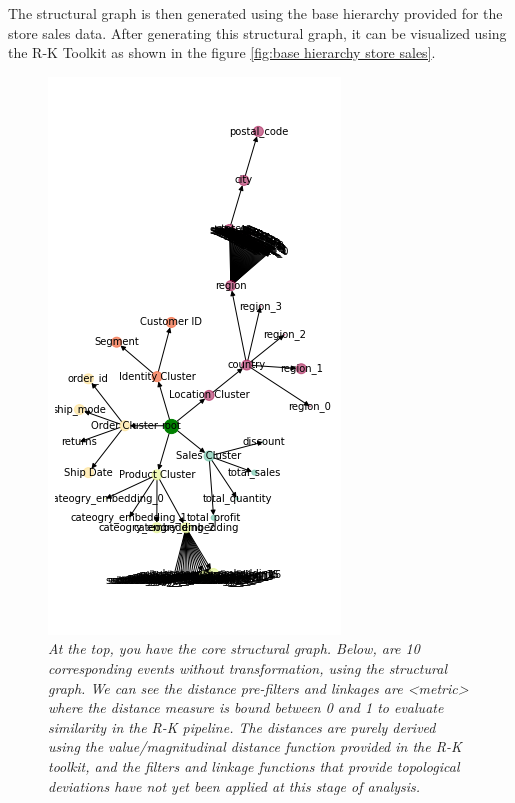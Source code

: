 The structural graph is then generated using the base hierarchy provided for the store sales data. After generating this structural graph, it can be visualized using the R-K Toolkit as shown in the figure  \ref{fig:base hierarchy store sales}.

\begin{figure}
	\centering
        \includegraphics[width=1.0\linewidth]{images/pre-filter-graphs.png}
	\caption{\textit{At the top, you have the core structural graph. Below, are 10 corresponding events without transformation, using the structural graph.  We can see the distance pre-filters and linkages are <metric> where the distance measure is bound between 0 and 1 to evaluate similarity in the R-K pipeline. The distances are purely derived using the value/magnitudinal distance function provided in the R-K toolkit, and the filters and linkage functions that provide topological deviations have not yet been applied at this stage of analysis.}}
	\label{fig:pre-filter-graphs}
\end{figure}

